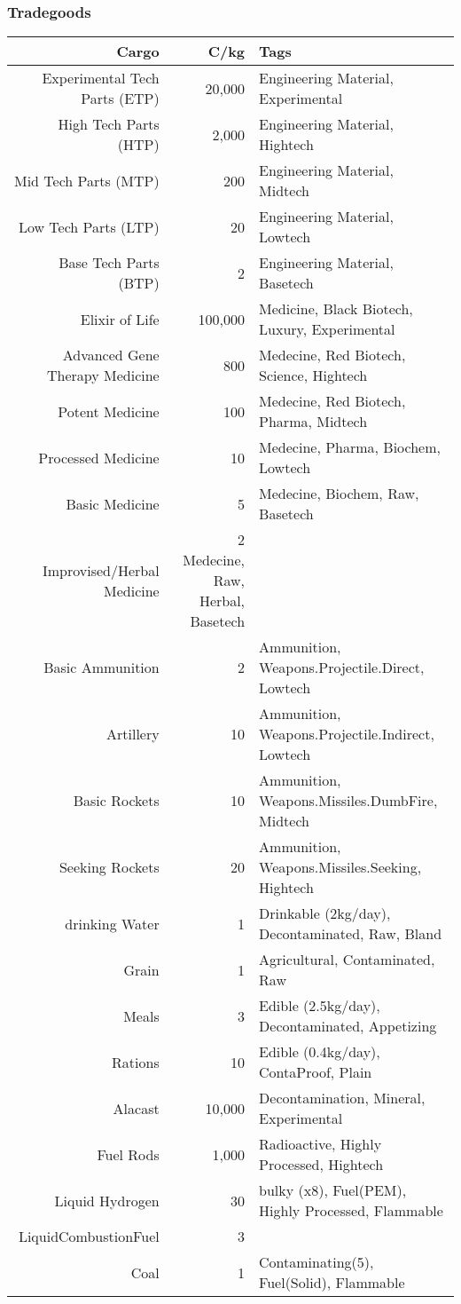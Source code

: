 \documentclass{article}
\begin{document}
    \subsubsection{Tradegoods}
    \begin{tabular}{|r|r|l}
        \hline
        Cargo & C/kg& Tags\\\hline
        \hline
        Experimental Tech Parts (ETP) & 20,000 & Engineering Material, Experimental\\\hline
        High Tech Parts (HTP)&2,000 & Engineering Material, Hightech\\\hline
        Mid Tech Parts (MTP) & 200 & Engineering Material, Midtech\\\hline
        Low Tech Parts (LTP) & 20 & Engineering Material, Lowtech\\\hline
        Base Tech Parts (BTP) & 2 & Engineering Material, Basetech\\\hline
        Elixir of Life & 100,000 & Medicine, Black Biotech, Luxury, Experimental\\\hline
        \hline
        Advanced Gene Therapy Medicine & 800 & Medecine, Red Biotech, Science, Hightech\\\hline
        Potent Medicine & 100 & Medecine, Red Biotech, Pharma, Midtech\\\hline
        Processed Medicine & 10 & Medecine, Pharma, Biochem, Lowtech\\\hline
        Basic Medicine & 5 & Medecine, Biochem, Raw, Basetech\\\hline
        Improvised/Herbal Medicine & 2 Medecine, Raw, Herbal, Basetech\\\hline
        \hline
        Basic Ammunition & 2 & Ammunition, Weapons.Projectile.Direct, Lowtech\\\hline
        Artillery & 10 & Ammunition, Weapons.Projectile.Indirect, Lowtech\\\hline
        Basic Rockets & 10 & Ammunition, Weapons.Missiles.DumbFire, Midtech\\\hline
        Seeking Rockets & 20 & Ammunition, Weapons.Missiles.Seeking, Hightech\\\hline
        \hline
        drinking Water & 1 & Drinkable (2kg/day), Decontaminated, Raw, Bland \\\hline
        Grain & 1 & Agricultural, Contaminated, Raw \\\hline
        Meals & 3 & Edible (2.5kg/day), Decontaminated, Appetizing\\\hline
        Rations & 10 & Edible (0.4kg/day), ContaProof, Plain\\\hline
        \hline
        Alacast & 10,000 & Decontamination, Mineral, Experimental\\\hline
        Fuel Rods & 1,000 & Radioactive, Highly Processed, Hightech \\\hline
        Liquid Hydrogen & 30 & bulky (x8), Fuel(PEM), Highly Processed, Flammable \\\hline
        LiquidCombustionFuel & 3\\\hline
        Coal & 1 & Contaminating(5), Fuel(Solid), Flammable\\\hline

    \end{tabular}\par
\end{document}
